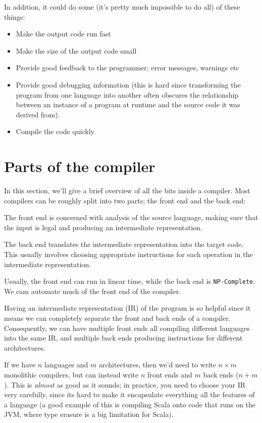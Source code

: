 In addition, it could do some (it's pretty much impossible to do all) of these
things:

\begin{itemize}
  \item Make the output code run fast
  \item Make the size of the output code small
  \item Provide good feedback to the programmer; error messages, warnings etc
  \item Provide good debugging information (this is hard since transforming the
  program from one language into another often obscures the relationship between
  an instance of a program at runtime and the source code it was derived from).
  \item Compile the code quickly
\end{itemize}


\section{Parts of the compiler}

In this section, we'll give a brief overview of all the bits inside a compiler.
Most compilers can be roughly split into two parts; the front end and the back
end:

\begin{description}
  \item The front end is concerned with analysis of the source language, making
  sure that the input is legal and producing an intermediate representation.
  \item The back end translates the intermediate representation into the target
  code. This usually involves choosing appropriate instructions for each 
  operation in the intermediate representation.
\end{description}

Usually, the front end can run in linear time, while the back end is
\texttt{NP-Complete}. We cam automate much of the front end of the compiler.

Having an intermediate representation (IR) of the program is so helpful since it
means we can completely separate the front and back ends of a compiler.
Consequently, we can have multiple front ends all compiling different languages
into the same IR, and multiple back ends producing instructions for different
architectures.

If we have $n$ languages and $m$ architectures, then we'd need to write $n
\times m$ monolithic compilers, but can instead write $n$ front ends and $m$
back ends ($n+ m$). This is \textit{almost} as good as it sounds; in practice,
you need to choose your IR very carefully, since its hard to make it encapsulate
everything all the features of a language (a good example of this is compiling
Scala onto code that runs on the JVM, where type erasure is a big limitation for
Scala).

